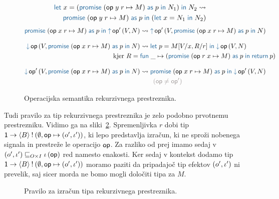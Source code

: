 \begin{figure}[H]
	\centering
	\small~
	\begin{align*}
		\tmlet{x}{(\tmwithrec{op}{y}{r}{M}{p}{N_1})}{N_2} \reduces \\
		\tmwithrec{op}{y}{r}{M}{p}{(\tmlet{x}{N_1}{N_2})}
	\end{align*}
	\vspace{-5ex}
	\begin{align*}
		\tmwithrec{op}{x}{r}{M}{p}{\tmopout{op'}{V}{N}} &\reduces \tmopout{op'}{V}{\tmwithrec{op}{x}{r}{M}{p}{N}}
		\razmik
		\tmopin{op}{V}{\tmwithrec{op}{x}{r}{M}{p}{N}} &\reduces \tmlet{p}{M[V/x, R/r]}{\tmopin{op}{V}{N}} \\
		\text{kjer }R = \;& \tmfunano{\_}{(\tmwithrec{op}{r}{x}{M}{p}{\tmreturn{p}})}
		\razmik
		\tmopin{op'}{V}{\tmwithrec{op}{x}{r}{M}{p}{N}} &\reduces \tmwithrec{op}{x}{r}{M}{p}{\tmopin{op'}{V}{N}} \\
		&\qquad {\color{rulenameColor}(\op \neq \op')}
	\end{align*}
	
	\caption{Operacijska semantika rekurzivnega prestreznika.}
	\label{fig:semantika-prestreznik}
\end{figure}

Tudi pravilo za tip rekurzivnega prestreznika je zelo podobno prvotnemu prestrezniku. Vidimo ga na sliki~\ref{fig:tipi-pravila-rekurzivni-prestreznik}. Spremenljivka $r$ dobi tip $\tyfun{\tyunit}{\tycomp{\typromise{B}}{\emptyset, \op \mapsto (\o', \i')}}$, ki lepo predstavlja izračun, ki ne sproži nobenega signala in prestreže le operacijo $\op$.
Za razliko od prej imamo sedaj v $({\o'} , {\i'}) \order{O \times I} \i\, (\op)$ red namesto enakosti. Ker sedaj v kontekst dodamo tip $\tyfun{\tyunit}{\tycomp{\typromise{B}}{\emptyset, \op \mapsto (\o', \i')}}$ moramo paziti da pripadajoč tip efektov $(\o', \i')$ ni prevelik, saj sicer morda ne bomo mogli določiti tipa za $M$.

\begin{figure}[H]
	\centering
	\small
	\begin{mathpar}
	\end{mathpar}
	
	\caption{Pravilo za izračun tipa rekurzivnega prestreznika.}
	\label{fig:tipi-pravila-rekurzivni-prestreznik}
\end{figure} 


